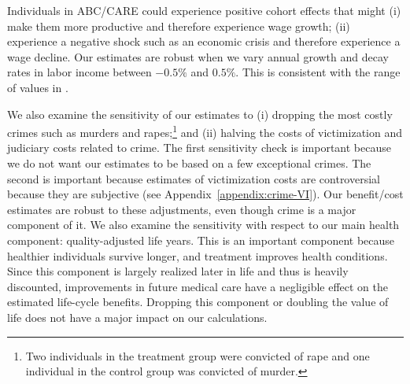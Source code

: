 Individuals in ABC/CARE could experience positive cohort effects that might (i) make them more productive and therefore experience wage growth; (ii) experience a negative shock such as an economic crisis and therefore experience a wage decline. Our estimates are robust when we vary annual growth and decay rates in labor income between $-0.5\%$ and $0.5\%$. This is consistent with the range of values in \citet{Lagakos_Moll_etal_2016_LifeCycle_NBER}.

We also examine the sensitivity of our estimates to (i) dropping the most costly crimes such as murders and rapes;\footnote{Two individuals in the treatment group were convicted of rape and one individual in the control group was convicted of murder.} and (ii) halving the costs of victimization and judiciary costs related to crime. The first sensitivity check is important because we do not want our estimates to be based on a few exceptional crimes. The second is important because estimates of victimization costs are controversial because they are subjective (see  Appendix~\ref{appendix:crime-VI}). Our benefit/cost estimates are robust to these adjustments, even though crime is a major component of it. We also examine the sensitivity with respect to our main health component: quality-adjusted life years. This is an important component because healthier individuals survive longer, and treatment improves health conditions. Since this component is largely realized later in life and thus is heavily discounted, improvements in future medical care have a negligible effect on the estimated life-cycle benefits. Dropping this component or doubling the value of life does not have a major impact on our calculations.

